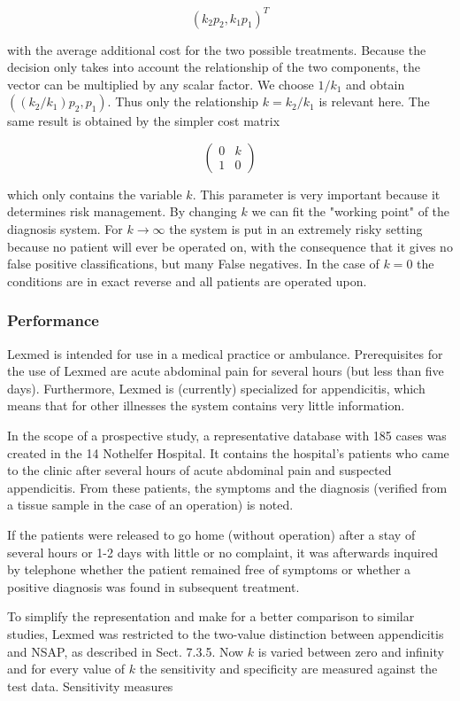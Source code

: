 \documentclass[10pt]{article}
\begin{document}
$$
\left(k_{2} p_{2}, k_{1} p_{1}\right)^{T}
$$

with the average additional cost for the two possible treatments. Because the decision only takes into account the relationship of the two components, the vector can be multiplied by any scalar factor. We choose $1 / k_{1}$ and obtain $\left(\left(k_{2} / k_{1}\right) p_{2}, p_{1}\right)$. Thus only the relationship $k=k_{2} / k_{1}$ is relevant here. The same result is obtained by the simpler cost matrix

$$
\left(\begin{array}{ll}
0 & k \\
1 & 0
\end{array}\right)
$$

which only contains the variable $k$. This parameter is very important because it determines risk management. By changing $k$ we can fit the "working point" of the diagnosis system. For $k \rightarrow \infty$ the system is put in an extremely risky setting because no patient will ever be operated on, with the consequence that it gives no false positive classifications, but many False negatives. In the case of $k=0$ the conditions are in exact reverse and all patients are operated upon.

\subsubsection*{Performance}
Lexmed is intended for use in a medical practice or ambulance. Prerequisites for the use of Lexmed are acute abdominal pain for several hours (but less than five days). Furthermore, Lexmed is (currently) specialized for appendicitis, which means that for other illnesses the system contains very little information.

In the scope of a prospective study, a representative database with 185 cases was created in the 14 Nothelfer Hospital. It contains the hospital's patients who came to the clinic after several hours of acute abdominal pain and suspected appendicitis. From these patients, the symptoms and the diagnosis (verified from a tissue sample in the case of an operation) is noted.

If the patients were released to go home (without operation) after a stay of several hours or 1-2 days with little or no complaint, it was afterwards inquired by telephone whether the patient remained free of symptoms or whether a positive diagnosis was found in subsequent treatment.

To simplify the representation and make for a better comparison to similar studies, Lexmed was restricted to the two-value distinction between appendicitis and NSAP, as described in Sect. 7.3.5. Now $k$ is varied between zero and infinity\\
and for every value of $k$ the sensitivity and specificity are measured against the test data. Sensitivity measures
\end{document}
